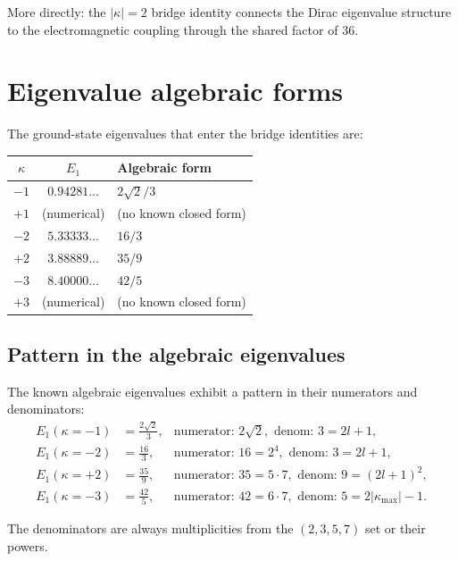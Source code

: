 \documentclass[11pt,letterpaper]{article}
\numberwithin{equation}{section}
\begin{document}
More directly: the $|\kappa| = 2$ bridge identity connects the Dirac
eigenvalue structure to the electromagnetic coupling through the shared
factor of 36.

\section{Eigenvalue algebraic forms}
\label{sec:eigenvalue_algebra}

The ground-state eigenvalues that enter the bridge identities are:

\begin{center}
\begin{tabular}{ccl}
\toprule
$\kappa$ & $E_1$ & Algebraic form \\
\midrule
$-1$ & $0.94281\ldots$ & $2\sqrt{2}/3$ \\
$+1$ & (numerical) & (no known closed form) \\
$-2$ & $5.33333\ldots$ & $16/3$ \\
$+2$ & $3.88889\ldots$ & $35/9$ \\
$-3$ & $8.40000\ldots$ & $42/5$ \\
$+3$ & (numerical) & (no known closed form) \\
\bottomrule
\end{tabular}
\end{center}

\subsection{Pattern in the algebraic eigenvalues}

The known algebraic eigenvalues exhibit a pattern in their numerators and
denominators:
\begin{align}
  E_1(\kappa=-1) &= \frac{2\sqrt{2}}{3}, & \text{numerator: } 2\sqrt{2}, \text{ denom: } 3 = 2l+1, \\
  E_1(\kappa=-2) &= \frac{16}{3}, & \text{numerator: } 16 = 2^4, \text{ denom: } 3 = 2l+1, \\
  E_1(\kappa=+2) &= \frac{35}{9}, & \text{numerator: } 35 = 5 \cdot 7, \text{ denom: } 9 = (2l+1)^2, \\
  E_1(\kappa=-3) &= \frac{42}{5}, & \text{numerator: } 42 = 6 \cdot 7, \text{ denom: } 5 = 2|\kappa_\mathrm{max}|-1.
\end{align}

The denominators are always multiplicities from the $(2, 3, 5, 7)$ set or
their powers.
\end{document}
